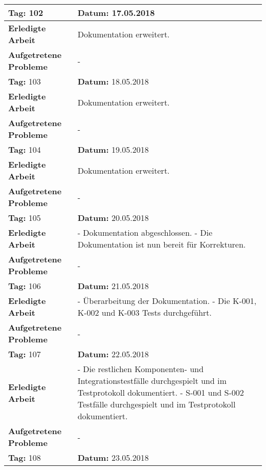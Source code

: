\begin{longtable}{|p{5cm}|p{5cm}p{6cm}|}
\rowcolor{heading}\textbf{Tag:} 102 & \textbf{Datum:} 17.05.2018 & \\ \hline
\textbf{Erledigte Arbeit} & \multicolumn{2}{p{11cm}|}{Dokumentation erweitert.} \\ \hline
\textbf{Aufgetretene Probleme} & \multicolumn{2}{p{11cm}|}{-} \\ \hline
\rowcolor{heading}\textbf{Tag:} 103 & \textbf{Datum:} 18.05.2018 & \\ \hline
\textbf{Erledigte Arbeit} & \multicolumn{2}{p{11cm}|}{Dokumentation erweitert.} \\ \hline
\textbf{Aufgetretene Probleme} & \multicolumn{2}{p{11cm}|}{-} \\ \hline
\rowcolor{heading}\textbf{Tag:} 104 & \textbf{Datum:} 19.05.2018 & \\ \hline
\textbf{Erledigte Arbeit} & \multicolumn{2}{p{11cm}|}{Dokumentation erweitert.} \\ \hline
\textbf{Aufgetretene Probleme} & \multicolumn{2}{p{11cm}|}{-} \\ \hline
\rowcolor{heading}\textbf{Tag:} 105 & \textbf{Datum:} 20.05.2018 & \\ \hline
\textbf{Erledigte Arbeit} & \multicolumn{2}{p{11cm}|}{- Dokumentation abgeschlossen. \newline
- Die Dokumentation ist nun bereit für Korrekturen.} \\ \hline
\textbf{Aufgetretene Probleme} & \multicolumn{2}{p{11cm}|}{-} \\ \hline
\rowcolor{heading}\textbf{Tag:} 106 & \textbf{Datum:} 21.05.2018 & \\ \hline
\textbf{Erledigte Arbeit} & \multicolumn{2}{p{11cm}|}{- Überarbeitung der Dokumentation. \newline
- Die K-001, K-002 und K-003 Tests durchgeführt. } \\ \hline
\textbf{Aufgetretene Probleme} & \multicolumn{2}{p{11cm}|}{-} \\ \hline
\rowcolor{heading}\textbf{Tag:} 107 & \textbf{Datum:} 22.05.2018 & \\ \hline
\textbf{Erledigte Arbeit} & \multicolumn{2}{p{11cm}|}{- Die restlichen Komponenten- und Integrationstestfälle durchgespielt und im Testprotokoll dokumentiert.\newline 
- S-001 und S-002 Testfälle durchgespielt und im Testprotokoll dokumentiert.} \\ \hline
\textbf{Aufgetretene Probleme} & \multicolumn{2}{p{11cm}|}{-} \\ \hline
\rowcolor{heading}\textbf{Tag:} 108 & \textbf{Datum:} 23.05.2018 & \\ \hline

\end{longtable}
